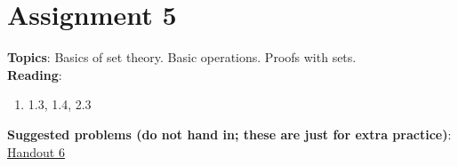 \documentclass[12pt]{article}
\begin{document}
\section[5 (due \csname dateWeek5\endcsname): Set theory. Basic operations. Proofs with sets.]{Assignment 5}

\textbf{Topics}: Basics of set theory. Basic operations. Proofs with sets.
\\

\noindent \textbf{Reading}:
\begin{enumerate}
\item 1.3, 1.4, 2.3
\end{enumerate}




\noindent \textbf{Suggested problems (do not hand in; these are just for extra practice)}: \href{https://www.math.emory.edu/~dzb/teaching/250Fall2021/handouts/250-H06-sets-I.pdf}{Handout 6}
\\


\end{document}

